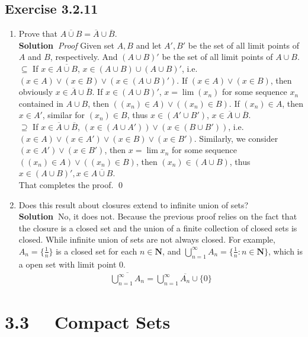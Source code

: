 \documentclass[12pt]{report}
\newcommand{\sol}{{\textbf{Solution~}}}
\begin{document}
\subsection*{Exercise 3.2.11}
\begin{enumerate}[label=(\alph*)]
    \item Prove that $\overline{A \cup B}=\overline{A}\cup\overline{B}$.\\
    \sol \textit{Proof} Given set $A,B$ and let $A', B'$ be the set of all limit points of $A$ and $B$, respectively. 
    And $(A \cup B)'$ be the set of all limit points of $A \cup B$.\\
    $\subseteq$ If $x \in \overline{A \cup B}$, $x \in (A \cup B)\cup(A \cup B)'$, i.e. 
    $(x \in A) \lor (x\in B) \lor (x\in (A \cup B)')$. If $(x \in A) \lor (x \in B)$, then obviously 
    $x \in \overline{A}\cup\overline{B}$. If $x\in (A \cup B)'$, $x =\lim (x_n)$ for some sequence $x_n$ 
    contained in $A\cup B$, then $((x_n) \in A) \lor ((x_n) \in B)$. If $(x_n) \in A$, then $x \in A'$, 
    similar for $(x_n) \in B$, thus $x \in (A'\cup B')$, $x \in \overline{A}\cup\overline{B}$.\\
    $\supseteq$ If $x \in \overline{A}\cup\overline{B}$, $(x \in (A \cup A')) \lor (x \in (B \cup B'))$, i.e. 
    $(x \in A) \lor (x \in A') \lor (x \in B) \lor (x\in B')$. Similarly, we consider $(x \in A') \lor (x \in B')$, then 
    $x =\lim x_n$ for some sequence $((x_n)\in A) \lor ((x_n) \in B)$, then $(x_n) \in (A \cup B)$, thus 
    $x \in (A \cup B)', x\in \overline{A\cup B}$.\\
    That completes the proof. \qed  
    \item Does this result about closures extend to infinite union of sets?\\
    \sol No, it does not. Because the previous proof relies on the fact that 
    the closure is a closed set and the union of a finite collection of closed sets is closed. 
    While infinite union of sets are not always closed. For example, $A_n = \{\frac{1}{n}\}$ is a closed set for each $n \in \mathbf{N}$, 
    and $\bigcup_{n=1}^\infty A_n= \{\frac{1}{n}: n \in \mathbf{N}\}$, which is a open set with limit point 0.
    \begin{align*}
        \overline{\bigcup_{n=1}^\infty A_n}= \bigcup_{n=1}^\infty \overline{A_n} \cup \{0\}
    \end{align*}
\end{enumerate}

\section{3.3 ~~Compact Sets}
\end{document}
